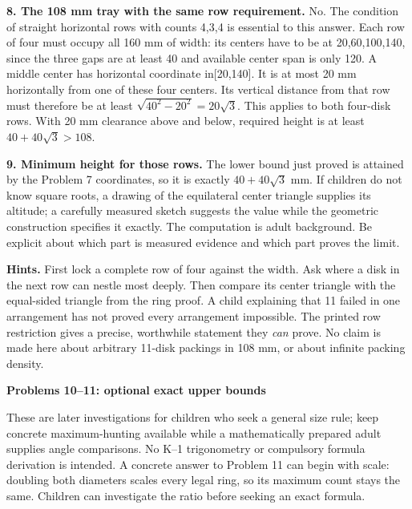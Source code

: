 \documentclass[11pt]{article}
\newcommand{\heading}[1]{\par\textbf{#1}\par}
\begin{document}
\textbf{8. The 108 mm tray with the same row requirement.} No. The condition of straight horizontal rows with counts 4,3,4 is essential to this answer. Each row of four must occupy all 160 mm of width: its centers have to be at 20,60,100,140, since the three gaps are at least 40 and available center span is only 120. A middle center has horizontal coordinate in[20,140]. It is at most 20 mm horizontally from one of these four centers. Its vertical distance from that row must therefore be at least $\sqrt{40^2-20^2}=20\sqrt 3$. This applies to both four-disk rows. With 20 mm clearance above and below, required height is at least $40+40\sqrt 3>108$.

\textbf{9. Minimum height for those rows.} The lower bound just proved is attained by the Problem 7 coordinates, so it is exactly $40+40\sqrt 3$ mm. If children do not know square roots, a drawing of the equilateral center triangle supplies its altitude; a carefully measured sketch suggests the value while the geometric construction specifies it exactly. The computation is adult background. Be explicit about which part is measured evidence and which part proves the limit.

\begin{center}\end{center}
\textbf{Hints.} First lock a complete row of four against the width. Ask where a disk in the next row can nestle most deeply. Then compare its center triangle with the equal-sided triangle from the ring proof. A child explaining that 11 failed in one arrangement has not proved every arrangement impossible. The printed row restriction gives a precise, worthwhile statement they \emph{can} prove. No claim is made here about arbitrary 11-disk packings in 108 mm, or about infinite packing density.
\newpage
\heading{Problems 10--11: optional exact upper bounds}
These are later investigations for children who seek a general size rule; keep concrete maximum-hunting available while a mathematically prepared adult supplies angle comparisons. No K--1 trigonometry or compulsory formula derivation is intended. A concrete answer to Problem 11 can begin with scale: doubling both diameters scales every legal ring, so its maximum count stays the same. Children can investigate the ratio before seeking an exact formula.
\end{document}
